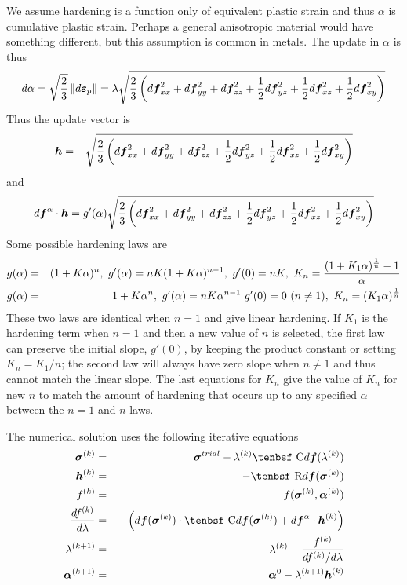 \documentclass[11pt]{book}
\renewcommand{\vec}[1]{\boldsymbol{#1}}
\def\C{\hbox{\tenbsf C}}
\def\dpl{d \vec{\varepsilon}_{p}}
\def\df{d \vec{f}}
\def\dfa{d \vec{f}^\alpha}
\def\R{\hbox{\tenbsf R}}
\begin{document}
We assume hardening is a function only of equivalent plastic strain and thus $\alpha$ is cumulative plastic strain. Perhaps a general anisotropic material would have something different, but this assumption is common in metals. The update in $\alpha$ is thus
\begin{equation}
     d\alpha = \sqrt{2\over 3}\thinspace \| \dpl\| = \lambda \sqrt{{2\over 3}\left(\df_{xx}^2 + \df_{yy}^2 + \df_{zz}^2 + {1\over2}\df_{yz}^2+ {1\over2}\df_{xz}^2+ {1\over2}\df_{xy}^2\right)}
\end{equation}
Thus the update vector is
\begin{equation}
      \vec h = - \sqrt{{2\over 3}\left(\df_{xx}^2 + \df_{yy}^2 + \df_{zz}^2 + {1\over2}\df_{yz}^2+ {1\over2}\df_{xz}^2+ {1\over2}\df_{xy}^2\right)}
\end{equation}
and
\begin{equation}
   \dfa \cdot \vec h =  g'(\alpha)\sqrt{{2\over 3}\left(\df_{xx}^2 + \df_{yy}^2 + \df_{zz}^2 + {1\over2}\df_{yz}^2+ {1\over2}\df_{xz}^2 + {1\over2}\df_{xy}^2\right)}
\end{equation}
Some possible hardening laws are
\begin{eqnarray}
     g(\alpha)  & = & (1 + K\alpha)^n, \  g'(\alpha) =  nK(1+K\alpha)^{n-1}, \  g'(0)=nK, \  K_n={(1+K_1\alpha)^{1\over n} - 1\over \alpha}  \\
     g(\alpha)  & = & 1 + K\alpha^n, \  g'(\alpha) =  nK\alpha^{n-1} \  g'(0)=0\ (n\ne1), \ K_n = (K_1\alpha)^{1\over n}
\end{eqnarray}
These two laws are identical when $n=1$ and give linear hardening. If $K_1$ is the hardening term when $n=1$ and then a new value of $n$ is selected, the first law can preserve the initial slope, $g'(0)$, by keeping the product constant or setting $K_n = K_1/n$; the second law will always have zero slope when $n\ne1$ and thus cannot match the linear slope. The last equations for $K_n$ give the value of $K_n$ for new $n$ to match the amount of hardening that occurs up to any specified $\alpha$ between the $n=1$ and $n$ laws.

The numerical solution uses the following iterative equations
\begin{eqnarray}
       \vec\sigma^{(k)} & = & \vec\sigma^{trial} - \lambda^{(k)}\C\df(\lambda^{(k)}) \\
        \vec h^{(k)} & = & -\R\df(\vec\sigma^{(k)}) \\
        f^{(k)} & = &  f( \vec\sigma^{(k)},\vec\alpha^{(k)})  \\
        {df^{(k)}\over d\lambda} & = & -\left( \df(\vec\sigma^{(k)})\cdot \C\df(\vec\sigma^{(k)})  + \dfa \cdot \vec h^{(k)}\right) \\
        \lambda^{(k+1)} & = & \lambda^{(k)} - {f^{(k)} \over {df^{(k)}/ d\lambda} } \\
        \vec\alpha^{(k+1)} & = & \vec\alpha^{0} -  \lambda^{(k+1)} \vec h^{(k)}
\end{eqnarray}
\end{document}

